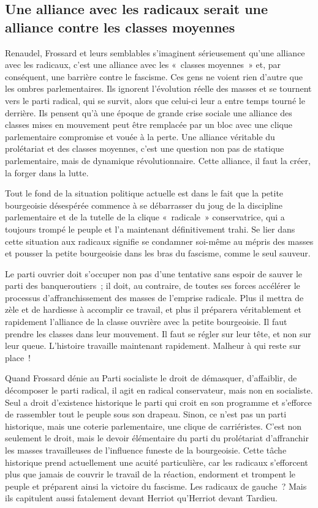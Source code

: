 \documentclass[french,twoside]{book} %
\begin{document}
\subsection[{Une alliance avec les radicaux serait une alliance contre les classes moyennes}]{Une alliance avec les radicaux serait une alliance contre les classes moyennes}
\noindent Renaudel, Frossard et leurs semblables s’imaginent sérieusement qu’une alliance avec les radicaux, c’est une alliance avec les « classes moyennes » et, par conséquent, une barrière contre le fascisme. Ces gens ne voient rien d’autre que les ombres parlementaires. Ils ignorent l’évolution  réelle des masses et se tournent vers le parti radical, qui se survit, alors que celui-ci leur a entre temps tourné le derrière. Ils pensent qu’à une époque de grande crise sociale une alliance des classes mises en mouvement peut être remplacée par un bloc avec une clique parlementaire compromise et vouée à la perte. Une alliance véritable du prolétariat et des classes moyennes, c’est une question non pas de statique parlementaire, mais de dynamique révolutionnaire. Cette alliance, il faut la créer, la forger dans la lutte.\par
Tout le fond de la situation politique actuelle est dans le fait que la petite bourgeoisie désespérée commence à se débarrasser du joug de la discipline parlementaire et de la tutelle de la clique « radicale » conservatrice, qui a toujours trompé le peuple et l’a maintenant définitivement trahi. Se lier dans cette situation aux radicaux signifie se condamner soi-même au mépris des masses et pousser la petite bourgeoisie dans les bras du fascisme, comme le seul sauveur.\par
Le parti ouvrier doit s’occuper non pas d’une tentative sans espoir de sauver le parti des banqueroutiers ; il doit, au contraire, de toutes ses forces accélérer le processus d’affranchissement des masses de l’emprise radicale. Plus il mettra de zèle et de hardiesse à accomplir ce travail, et plus il préparera véritablement et rapidement l’alliance de la classe ouvrière avec la petite bourgeoisie. Il faut prendre les classes dans leur mouvement. Il faut se régler sur leur tête, et non sur leur queue. L’histoire travaille maintenant rapidement. Malheur à qui reste sur place !\par
Quand Frossard dénie au Parti socialiste le droit de démasquer, d’affaiblir, de décomposer le parti radical, il agit en radical conservateur, mais non en socialiste. Seul a droit d’existence historique le parti qui croit en son programme et s’efforce de rassembler tout le peuple sous son drapeau. Sinon, ce n’est pas un parti historique, mais une  coterie parlementaire, une clique de carriéristes. C’est non seulement le droit, mais le devoir élémentaire du parti du prolétariat d’affranchir les masses travailleuses de l’influence funeste de la bourgeoisie. Cette tâche historique prend actuellement une acuité particulière, car les radicaux s’efforcent plus que jamais de couvrir le travail de la réaction, endorment et trompent le peuple et préparent ainsi la victoire du fascisme. Les radicaux de gauche ? Mais ils capitulent aussi fatalement devant Herriot qu’Herriot devant Tardieu.\par
\end{document}
